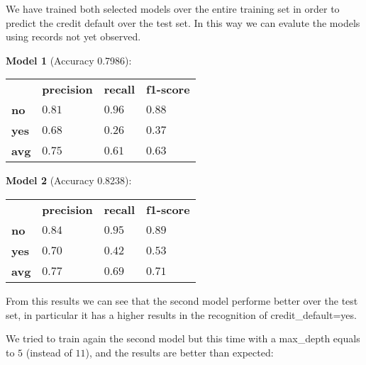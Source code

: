 We have trained both selected models over the entire training set in order to predict the credit default over the test set. In this way we can evalute the models using records not yet observed.

\medskip

\textbf{Model 1} (Accuracy 0.7986):

\begin{table}[h]
\centering
\begin{adjustbox}{width=.30\textwidth}
\small
\begin{tabular}{llll}
               & \textbf{precision} & \textbf{recall} & \textbf{f1-score} \\ \rowcolor[HTML]{EFEFEF} 
 \textbf{no}   &  $0.81$            & $0.96$          & $0.88$            \\
 \textbf{yes}  &  $0.68$            & $0.26$          & $0.37$            \\ \rowcolor[HTML]{EFEFEF} 
 \textbf{avg}  &  $0.75$            & $0.61$          & $0.63$            \\
\end{tabular}
\end{adjustbox}
\end{table}

\medskip

\textbf{Model 2} (Accuracy 0.8238):

\begin{table}[h]
\centering
\begin{adjustbox}{width=.30\textwidth}
\small
\begin{tabular}{llll}
               & \textbf{precision} & \textbf{recall} & \textbf{f1-score} \\ \rowcolor[HTML]{EFEFEF} 
 \textbf{no}   &  $0.84$            & $0.95$          & $0.89$            \\
 \textbf{yes}  &  $0.70$            & $0.42$          & $0.53$            \\ \rowcolor[HTML]{EFEFEF} 
 \textbf{avg}  &  $0.77$            & $0.69$          & $0.71$            \\
\end{tabular}
\end{adjustbox}
\end{table}


From this results we can see that the second model performe better over the test set, in particular it has a higher results in the recognition of credit\_default=yes.

We tried to train again the second model but this time with a max\_depth equals to $5$ (instead of $11$), and the results are better than expected:


